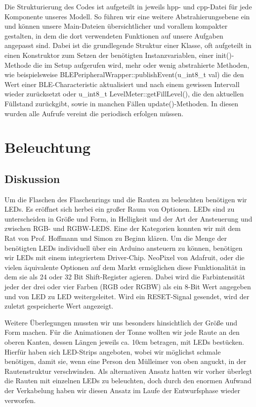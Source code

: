         Die Strukturierung des Codes ist aufgeteilt in jeweils hpp- und cpp-Datei für jede Komponente unseres Modell. So führen wir eine weitere Abstrahierungsebene ein und können unsere Main-Dateien übersichtlicher und vorallem kompakter gestalten, in dem die dort verwendeten Funktionen auf unsere Aufgaben angepasst sind.
        Dabei ist die grundlegende Struktur einer Klasse, oft aufgeteilt in einen Konstruktor zum Setzen der benötigten Instanzvariablen, einer init()-Methode die im Setup aufgerufen wird, mehr oder wenig abstrahierte  Methoden, wie beispielsweise BLEPeripheralWrapper::publishEvent(u\_int8\_t val) die den Wert einer BLE-Characteristic aktualisiert und nach einem gewissen Intervall wieder zurücksetzt oder u\_int8\_t LevelMeter::getFillLevel(), die den aktuellen Füllstand zurückgibt, sowie in manchen Fällen update()-Methoden.
        In diesen wurden alle Aufrufe vereint die periodisch erfolgen müssen.


\section{Beleuchtung}

    \subsection{Diskussion}

        Um die Flaschen des Flaschenrings und die Rauten zu beleuchten benötigen wir LEDs. Es eröffnet sich herbei ein großer Raum von Optionen. LEDs sind zu unterscheiden in Größe und Form, in Helligkeit und der Art der Ansteuerung und zwischen RGB- und RGBW-LEDS.
        Eine der Kategorien konnten wir mit dem Rat von Prof. Hoffmann und Simon zu Beginn klären. Um die Menge der benötigten LEDs individuell über ein Arduino ansteuern zu können, benötigen wir LEDs mit einem integriertem Driver-Chip. NeoPixel von Adafruit, oder die vielen äquivalente Optionen auf dem Markt ermöglichen diese Funktionalität in dem sie als 24 oder 32 Bit Shift-Register agieren. Dabei wird die Farbintensität jeder der drei oder vier Farben (RGB oder RGBW) als ein 8-Bit Wert angegeben und von LED zu LED weitergeleitet.
        Wird ein RESET-Signal gesendet, wird der zuletzt gespeicherte Wert angezeigt.

        Weitere Überlegungen mussten wir uns besonders hinsichtlich der Größe und Form machen. Für die Animationen der Tonne wollten wir jede Raute an den oberen Kanten, dessen Längen jeweils ca. 10cm betragen, mit LEDs bestücken. Hierfür haben sich LED-Strips angeboten, wobei wir möglichst schmale benötigen, damit sie, wenn eine Person den Mülleimer von oben anguckt, in der Rautenstruktur verschwinden. Als alternativen Ansatz hatten wir vorher überlegt die Rauten mit einzelnen LEDs zu beleuchten, doch durch den enormen Aufwand der Verkabelung haben wir diesen Ansatz im Laufe der Entwurfsphase wieder verworfen.

